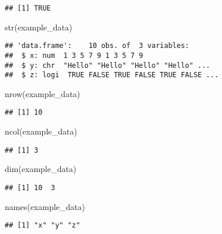 \documentclass[
]{article}
\newenvironment{Shaded}{\begin{snugshade}}{\end{snugshade}}
\newcommand{\FunctionTok}[1]{\textcolor[rgb]{0.00,0.00,0.00}{#1}}
\newcommand{\NormalTok}[1]{#1}
\begin{document}
\begin{verbatim}
## [1] TRUE
\end{verbatim}

\begin{Shaded}
\begin{Highlighting}[]
\FunctionTok{str}\NormalTok{(example\_data)}
\end{Highlighting}
\end{Shaded}

\begin{verbatim}
## 'data.frame':    10 obs. of  3 variables:
##  $ x: num  1 3 5 7 9 1 3 5 7 9
##  $ y: chr  "Hello" "Hello" "Hello" "Hello" ...
##  $ z: logi  TRUE FALSE TRUE FALSE TRUE FALSE ...
\end{verbatim}

\begin{Shaded}
\begin{Highlighting}[]
\FunctionTok{nrow}\NormalTok{(example\_data)}
\end{Highlighting}
\end{Shaded}

\begin{verbatim}
## [1] 10
\end{verbatim}

\begin{Shaded}
\begin{Highlighting}[]
\FunctionTok{ncol}\NormalTok{(example\_data)}
\end{Highlighting}
\end{Shaded}

\begin{verbatim}
## [1] 3
\end{verbatim}

\begin{Shaded}
\begin{Highlighting}[]
\FunctionTok{dim}\NormalTok{(example\_data)}
\end{Highlighting}
\end{Shaded}

\begin{verbatim}
## [1] 10  3
\end{verbatim}

\begin{Shaded}
\begin{Highlighting}[]
\FunctionTok{names}\NormalTok{(example\_data)}
\end{Highlighting}
\end{Shaded}

\begin{verbatim}
## [1] "x" "y" "z"
\end{verbatim}
\end{document}
